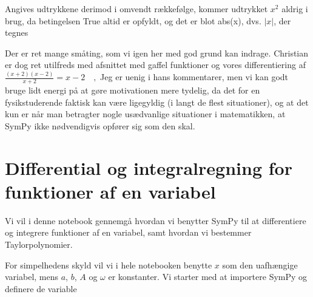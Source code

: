 \documentclass[letterpaper,10pt,english]{jupyterBook}
\begin{document}
\noindent{}

Angives udtrykkene derimod i omvendt rækkefølge, kommer udtrykket \(x^2\) aldrig i brug, da betingelsen True altid er opfyldt, og det er blot abs(x), dvs. \(|x|\), der tegnes

\begin{sphinxVerbatim}[commandchars=\\\{\}]
       

        
\end{sphinxVerbatim}

\noindent{}

Der er ret mange småting, som vi igen her med god grund kan indrage.
Christian er dog ret utilfreds med afsnittet med gaffel funktioner og vores differentiering af \(\frac{(x+2)(x-2)}{x+2} = x-2\quad,\)
Jeg er uenig i hans kommentarer, men vi kan godt bruge lidt energi på at gøre motivationen mere tydelig, da det for en fysikstuderende faktisk kan være ligegyldig (i langt de flest situationer), og at det kun er når man betragter nogle usædvanlige situationer i matematikken, at SymPy ikke nødvendigvis opfører sig som den skal.


\section{Differential\sphinxhyphen{} og integralregning for funktioner af en variabel}
\label{\detokenize{notebooks/sympy/Notebook4:differential-og-integralregning-for-funktioner-af-en-variabel}}\label{\detokenize{notebooks/sympy/Notebook4::doc}}
Vi vil i denne notebook gennemgå hvordan vi benytter SymPy til at differentiere og integrere funktioner af en variabel, samt hvordan vi bestemmer Taylorpolynomier.

For simpelhedens skyld vil vi i hele notebooken benytte \(x\) som den uafhængige variabel, mens \(a\), \(b\), \(A\) og \(\omega\) er konstanter. Vi starter med at importere SymPy og definere de variable
\end{document}
